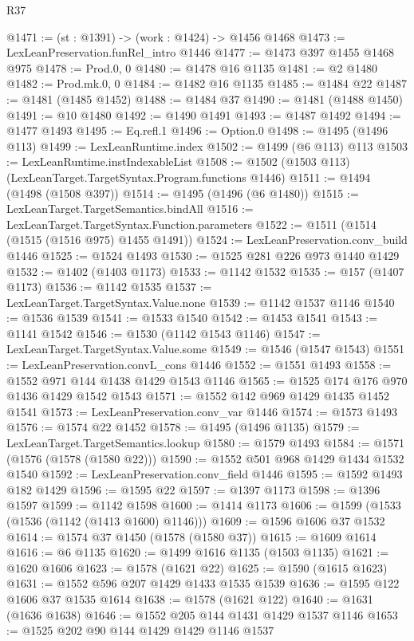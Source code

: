 \begin{lexlean}{R37}
\begin{coremodule}
@1471 := (st : @1391) -> (work : @1424) -> @1456 @1468
@1473 := LexLeanPreservation.funRel_intro @1446
@1477 := @1473 @397 @1455 @1468 @975
@1478 := Prod.{0, 0}
@1480 := @1478 @16 @1135
@1481 := @2 @1480
@1482 := Prod.mk.{0, 0}
@1484 := @1482 @16 @1135
@1485 := @1484 @22
@1487 := @1481 (@1485 @1452)
@1488 := @1484 @37
@1490 := @1481 (@1488 @1450)
@1491 := @10 @1480
@1492 := @1490 @1491
@1493 := @1487 @1492
@1494 := @1477 @1493
@1495 := Eq.refl.{1}
@1496 := Option.{0}
@1498 := @1495 (@1496 @113)
@1499 := LexLeanRuntime.index
@1502 := @1499 (@6 @113) @113
@1503 := LexLeanRuntime.instIndexableList
@1508 := @1502 (@1503 @113) (LexLeanTarget.TargetSyntax.Program.functions @1446)
@1511 := @1494 (@1498 (@1508 @397))
@1514 := @1495 (@1496 (@6 @1480))
@1515 := LexLeanTarget.TargetSemantics.bindAll
@1516 := LexLeanTarget.TargetSyntax.Function.parameters
@1522 := @1511 (@1514 (@1515 (@1516 @975) @1455 @1491))
@1524 := LexLeanPreservation.conv_build @1446
@1525 := @1524 @1493
@1530 := @1525 @281 @226 @973 @1440 @1429
@1532 := @1402 (@1403 @1173)
@1533 := @1142 @1532
@1535 := @157 (@1407 @1173)
@1536 := @1142 @1535
@1537 := LexLeanTarget.TargetSyntax.Value.none
@1539 := @1142 @1537 @1146
@1540 := @1536 @1539
@1541 := @1533 @1540
@1542 := @1453 @1541
@1543 := @1141 @1542
@1546 := @1530 (@1142 @1543 @1146)
@1547 := LexLeanTarget.TargetSyntax.Value.some
@1549 := @1546 (@1547 @1543)
@1551 := LexLeanPreservation.convL_cons @1446
@1552 := @1551 @1493
@1558 := @1552 @971 @144 @1438 @1429 @1543 @1146
@1565 := @1525 @174 @176 @970 @1436 @1429 @1542 @1543
@1571 := @1552 @142 @969 @1429 @1435 @1452 @1541
@1573 := LexLeanPreservation.conv_var @1446
@1574 := @1573 @1493
@1576 := @1574 @22 @1452
@1578 := @1495 (@1496 @1135)
@1579 := LexLeanTarget.TargetSemantics.lookup
@1580 := @1579 @1493
@1584 := @1571 (@1576 (@1578 (@1580 @22)))
@1590 := @1552 @501 @968 @1429 @1434 @1532 @1540
@1592 := LexLeanPreservation.conv_field @1446
@1595 := @1592 @1493 @182 @1429
@1596 := @1595 @22
@1597 := @1397 @1173
@1598 := @1396 @1597
@1599 := @1142 @1598
@1600 := @1414 @1173
@1606 := @1599 (@1533 (@1536 (@1142 (@1413 @1600) @1146)))
@1609 := @1596 @1606 @37 @1532
@1614 := @1574 @37 @1450 (@1578 (@1580 @37))
@1615 := @1609 @1614
@1616 := @6 @1135
@1620 := @1499 @1616 @1135 (@1503 @1135)
@1621 := @1620 @1606
@1623 := @1578 (@1621 @22)
@1625 := @1590 (@1615 @1623)
@1631 := @1552 @596 @207 @1429 @1433 @1535 @1539
@1636 := @1595 @122 @1606 @37 @1535 @1614
@1638 := @1578 (@1621 @122)
@1640 := @1631 (@1636 @1638)
@1646 := @1552 @205 @144 @1431 @1429 @1537 @1146
@1653 := @1525 @202 @90 @144 @1429 @1429 @1146 @1537

\end{coremodule}
\end{lexlean}

